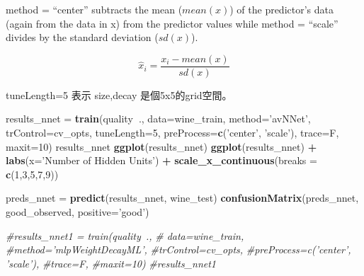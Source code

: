 \documentclass[]{book}
\newenvironment{Shaded}{\begin{snugshade}}{\end{snugshade}}
\newcommand{\KeywordTok}[1]{\textcolor[rgb]{0.13,0.29,0.53}{\textbf{#1}}}
\newcommand{\DataTypeTok}[1]{\textcolor[rgb]{0.13,0.29,0.53}{#1}}
\newcommand{\DecValTok}[1]{\textcolor[rgb]{0.00,0.00,0.81}{#1}}
\newcommand{\StringTok}[1]{\textcolor[rgb]{0.31,0.60,0.02}{#1}}
\newcommand{\CommentTok}[1]{\textcolor[rgb]{0.56,0.35,0.01}{\textit{#1}}}
\newcommand{\OperatorTok}[1]{\textcolor[rgb]{0.81,0.36,0.00}{\textbf{#1}}}
\newcommand{\NormalTok}[1]{#1}
\begin{document}
method = ``center'' subtracts the mean (\(mean(x)\)) of the predictor's data (again from the data in x) from the predictor values while method = ``scale'' divides by the standard deviation (\(sd(x)\)).

\[\hat{x}_i=\frac{x_i-mean(x)}{sd(x)}\]

tuneLength=5 表示 size,decay 是個5x5的grid空間。

\begin{Shaded}
\begin{Highlighting}[]
\NormalTok{results_nnet =}\StringTok{ }\KeywordTok{train}\NormalTok{(quality}\OperatorTok{~}\NormalTok{., }
                     \DataTypeTok{data=}\NormalTok{wine_train, }
                     \DataTypeTok{method=}\StringTok{'avNNet'}\NormalTok{,}
                     \DataTypeTok{trControl=}\NormalTok{cv_opts,}
                     \DataTypeTok{tuneLength=}\DecValTok{5}\NormalTok{,}
                     \DataTypeTok{preProcess=}\KeywordTok{c}\NormalTok{(}\StringTok{'center'}\NormalTok{, }\StringTok{'scale'}\NormalTok{),}
                     \DataTypeTok{trace=}\NormalTok{F, }
                     \DataTypeTok{maxit=}\DecValTok{10}\NormalTok{)}
\NormalTok{results_nnet}
\KeywordTok{ggplot}\NormalTok{(results_nnet)}
\KeywordTok{ggplot}\NormalTok{(results_nnet) }\OperatorTok{+}
\StringTok{  }\KeywordTok{labs}\NormalTok{(}\DataTypeTok{x=}\StringTok{'Number of Hidden Units'}\NormalTok{) }\OperatorTok{+}
\StringTok{  }\KeywordTok{scale_x_continuous}\NormalTok{(}\DataTypeTok{breaks =} \KeywordTok{c}\NormalTok{(}\DecValTok{1}\NormalTok{,}\DecValTok{3}\NormalTok{,}\DecValTok{5}\NormalTok{,}\DecValTok{7}\NormalTok{,}\DecValTok{9}\NormalTok{))}
\end{Highlighting}
\end{Shaded}

\begin{Shaded}
\begin{Highlighting}[]
\NormalTok{preds_nnet =}\StringTok{ }\KeywordTok{predict}\NormalTok{(results_nnet, wine_test)}
\KeywordTok{confusionMatrix}\NormalTok{(preds_nnet, good_observed, }\DataTypeTok{positive=}\StringTok{'good'}\NormalTok{)}


\CommentTok{#results_nnet1 = train(quality~., }
                    \CommentTok{# data=wine_train, }
                     \CommentTok{#method='mlpWeightDecayML',}
                     \CommentTok{#trControl=cv_opts,}
                     \CommentTok{#preProcess=c('center', 'scale'),}
                     \CommentTok{#trace=F, }
                     \CommentTok{#maxit=10)}
\CommentTok{#results_nnet1}
\end{Highlighting}
\end{Shaded}
\end{document}

